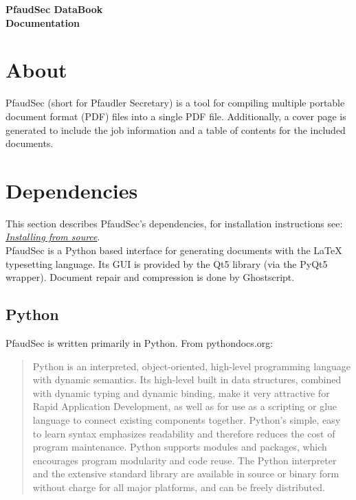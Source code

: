 \documentclass[14pt]{article}
\begin{document}
\setlength\headheight{20pt}
\begin{flushleft}

\fontsize{35}{35}\selectfont\textbf{PfaudSec DataBook\\ Documentation}\\

\normalsize

\setcounter{tocdepth}{2}
\setcounter{secnumdepth}{3}
\startcontents[section]
\begin{center}
\setlength{\parskip}{0.5em}
\setlength{\parskip}{1em}
\end{center}

\newenvironment{subs}
  {\adjustwidth{2em}{0pt}}
  {\endadjustwidth}



\section{About}

PfaudSec (short for Pfaudler Secretary) is a tool for compiling multiple portable document format (PDF) files into a single PDF file.
Additionally, a cover page is generated to include the job information and a table of contents for the included documents.

\section{Dependencies}

This section describes PfaudSec's dependencies, for installation instructions see:
\hyperref[sec:install]{\textit{Installing from source}}.\\[\normalbaselineskip]
PfaudSec is a Python based interface for generating documents with the \LaTeX\xspace typesetting language.
Its GUI is provided by the Qt5 library (via the PyQt5 wrapper).
Document repair and compression is done by Ghostscript.

	\subsection{Python}
PfaudSec is written primarily in Python.
From pythondocs.org:

\begin{quote}
Python is an interpreted, object-oriented, high-level programming language with dynamic semantics. Its high-level built in data structures, combined with dynamic typing and dynamic binding, make it very attractive for Rapid Application Development, as well as for use as a scripting or glue language to connect existing components together. Python's simple, easy to learn syntax emphasizes readability and therefore reduces the cost of program maintenance. Python supports modules and packages, which encourages program modularity and code reuse. The Python interpreter and the extensive standard library are available in source or binary form without charge for all major platforms, and can be freely distributed.\end{quote}


\end{flushleft}
\end{document}
